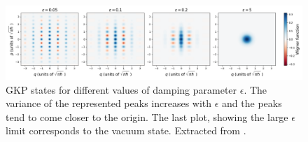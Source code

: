 \begin{figure}
    \centering
    \includegraphics[scale=0.35]{sphx_glr_run_GKP_bosonic_002.png}
    \caption[GKP state damping visualization]{GKP states for different values of damping parameter $\epsilon$. The variance of the represented peaks increases with $\epsilon$ and the peaks tend to come closer to the origin. The last plot, showing the large $\epsilon$ limit corresponds to the vacuum state. Extracted from \cite{strawberryFields}.}
    \label{fig:GKP_states}
\end{figure}
